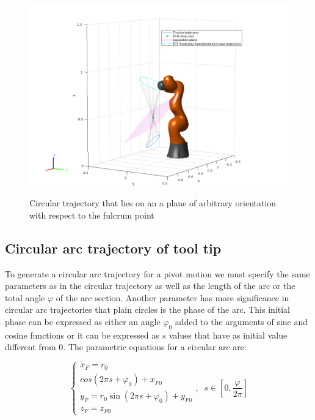 \begin{center}
\begin{figure}[!htb]
\centering
\includegraphics[width=\textwidth]{images/rcm_trajectories/robot-pose-random-rcm-circle-traj.png}\\
\caption{Circular trajectory that lies on an a plane of arbitrary orientation with respect to the fulcrum point}
\end{figure}
\end{center}


\subsection{Circular arc trajectory of tool tip}

To generate a circular arc trajectory for a pivot motion we must specify the same parameters as 
in the circular trajectory as well as the length of the arc or the total angle $φ$ of the arc 
section. Another parameter has more significance in circular arc trajectories that plain circles is the phase of the arc. This initial phase can be expressed as either an angle $φ_0$ added to the arguments of 
sine and cosine functions or it can be expressed as $s$ values that have as initial value different from $0$. The parametric equations for a circular arc are:

\begin{equation}
\begin{cases}
x^{}_{F} = r_0\\cos(2πs + φ_0) + x^{}_{F0} \\
y^{}_{F} = r_0\sin(2πs + φ_0) + y^{}_{F0} \\
z^{}_{F} = z^{}_{F0}
\end{cases} ,
\;\;
s \in \left[ 0, \frac{φ}{2π} \right]
\end{equation}

